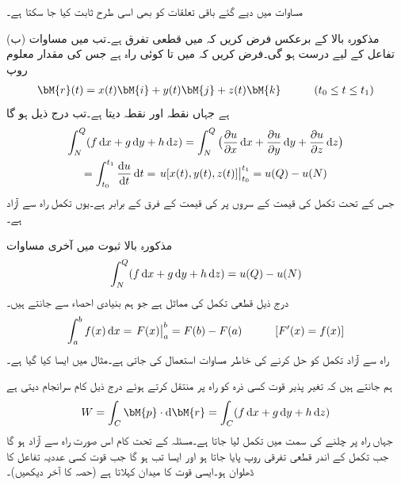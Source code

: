 مساوات  میں دیے گئے باقی تعلقات کو بھی اسی طرح ثابت کیا جا سکتا ہے۔

(ب) مذکورہ بالا کے برعکس فرض کریں کہ  میں  قطعی تفرق ہے۔تب   میں مساوات   تفاعل  کے لیے درست ہو گی۔فرض کریں کہ  میں  تا  کوئی راہ  ہے جس کی مقدار معلوم روپ
\begin{align*}
\bM{r}(t)=x(t)\bM{i}+y(t)\bM{j}+z(t)\bM{k}\quad \quad \quad (t_0\le t\le t_1)
\end{align*}
ہے جہاں  نقطہ  اور  نقطہ  دیتا ہے۔تب درج ذیل ہو گا
\begin{multline*}
\int_N^Q (f\dif x+g\dif y+h\dif z)=\int_N^Q \big(\frac{\partial u}{\partial x}\dif x+\frac{\partial u}{\partial y}\dif y+\frac{\partial u}{\partial z}\dif z\big)\\
=\int_{t_0}^{t_1}\frac{\dif u}{\dif t}\dif t=\left. u[x(t),y(t),z(t)]\right|_{t_0}^{t_1}=u(Q)-u(N)
\end{multline*} 
جس کے تحت تکمل کی قیمت  کے سروں پر  کی قیمت کے فرق کے برابر ہے۔یوں تکمل راہ سے آزاد ہے۔

مذکورہ بالا ثبوت میں آخری مساوات
\begin{align}\label{مساوات_خطی_تکمل_راہ_سے_آزاد_تکمل}
\int_N^Q (f\dif x+g\dif y+h\dif z)=u(Q)-u(N)
\end{align}
درج ذیل قطعی تکمل کی مماثل ہے جو ہم بنیادی احصاء سے جانتے ہیں۔
\begin{align*}
\int_a^b f(x)\dif x=\left. F(x)\right |_a^b=F(b)-F(a)\quad \quad \quad [F'(x)=f(x)]
\end{align*}
راہ سے آزاد تکمل کو حل کرنے کی خاطر مساوات  استعمال کی جاتی ہے۔مثال  میں ایسا کیا گیا ہے۔

ہم جانتے ہیں کہ تغیر پذیر قوت  کسی ذرہ کو راہ  پر منتقل کرتے ہوئے درج ذیل کام  سرانجام دیتی  ہے
\begin{align*}
W=\int_C \bM{p}\cdot \dif \bM{r}=\int_C (f\dif x+g\dif y+h\dif z)
\end{align*}
جہاں راہ پر چلنے کی سمت میں تکمل لیا جاتا ہے۔مسئلہ  کے تحت  کام اس صورت راہ سے آزاد ہو گا جب تکمل کے اندر قطعی تفرقی روپ پایا جاتا ہو اور ایسا تب ہو گا جب قوت  کسی عددیہ تفاعل  کا ڈھلوان ہو۔ایسی قوت کا میدان   کہلاتا ہے (حصہ  کا آخر دیکھیں)۔


